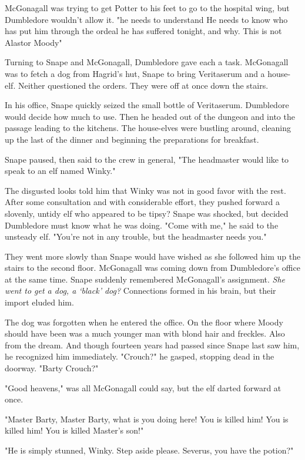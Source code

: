 McGonagall was trying to get Potter to his feet to go to the hospital wing, but Dumbledore wouldn't allow it. "{\el}he needs to understand{\el} He needs to know who has put him through the ordeal he has suffered tonight, and why. This is not Alastor Moody{\el}"

Turning to Snape and McGonagall, Dumbledore gave each a task. McGonagall was to fetch a dog from Hagrid's hut, Snape to bring Veritaserum and a house-elf. Neither questioned the orders. They were off at once down the stairs.

In his office, Snape quickly seized the small bottle of Veritaserum. Dumbledore would decide how much to use. Then he headed out of the dungeon and into the passage leading to the kitchens. The house-elves were bustling around, cleaning up the last of the dinner and beginning the preparations for breakfast.

Snape paused, then said to the crew in general, "The headmaster would like to speak to an elf named Winky."

The disgusted looks told him that Winky was not in good favor with the rest. After some consultation and with considerable effort, they pushed forward a slovenly, untidy elf who appeared to be{\el} tipsy? Snape was shocked, but decided Dumbledore must know what he was doing. "Come with me," he said to the unsteady elf. "You're not in any trouble, but the headmaster needs you."

They went more slowly than Snape would have wished as she followed him up the stairs to the second floor. McGonagall was coming down from Dumbledore's office at the same time. Snape suddenly remembered McGonagall's assignment. \emph{She went to get a dog, a `black' dog? }Connections formed in his brain, but their import eluded him.

The dog was forgotten when he entered the office. On the floor where Moody should have been was a much younger man with blond hair and freckles. Also from the dream. And though fourteen years had passed since Snape last saw him, he recognized him immediately. "Crouch?" he gasped, stopping dead in the doorway. "Barty Crouch?"

"Good heavens," was all McGonagall could say, but the elf darted forward at once.

"Master Barty, Master Barty, what is you doing here! You is killed him! You is killed him! You is killed Master's son!"

"He is simply stunned, Winky. Step aside please. Severus, you have the potion?"


